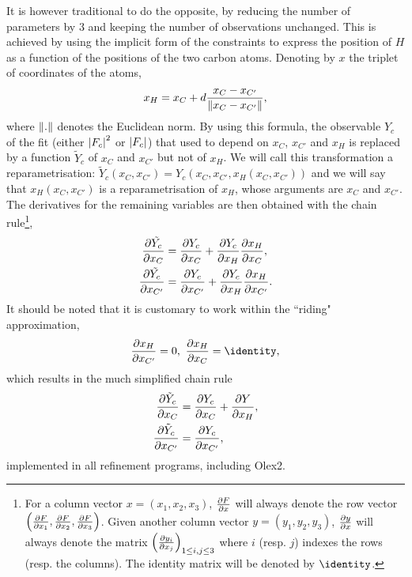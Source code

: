 \documentclass[pdf]{iucr}
\begin{document}
It is however traditional to do the opposite, by reducing the number of parameters by 3 and keeping the number of observations unchanged. This is achieved by using the implicit form of the constraints to express the position of $H$ as a function of the positions of the two carbon atoms. Denoting by $x$ the triplet of coordinates of the atoms,
\begin{equation}
x_H = x_C + d \frac{x_C - x_{C'}}{\left\| x_C - x_{C'} \right\|},
\end{equation} 
where $\left\| . \right\|$ denotes the Euclidean norm. By using this formula, the observable $Y_c$ of the fit (either $\left| F_c \right|^2$ or $\left| F_c \right|$) that used to depend on $x_C$, $x_{C'}$ and $x_H$ is replaced by a function $\tilde{Y}_c$ of $x_C$ and $x_{C'}$ but not of $x_H$. We will call this transformation a reparametrisation: $\tilde{Y}_c(x_C, x_{C'}) = Y_c(x_C, x_{C'}, x_H(x_C, x_{C'}))$ and we will say that $x_H(x_C, x_{C'})$ is a reparametrisation of $x_H$, whose arguments are $x_C$ and $x_{C'}$. The derivatives for the remaining variables are then obtained with the chain rule\footnote{For a column vector $x=(x_1, x_2, x_3)$, $\frac{\partial F}{\partial x}$ will always denote the row vector $\left(\frac{\partial F}{\partial x_1}, \frac{\partial F}{\partial x_2}, \frac{\partial F}{\partial x_3}\right)$. Given another column vector $y=(y_1, y_2, y_3)$, $\frac{\partial y}{\partial x}$ will always denote the matrix $\left(\frac{\partial y_i}{\partial x_j}\right)_{1 \le i,j \le 3}$ where $i$ (resp. $j$) indexes the rows (resp. the columns). The identity matrix will be denoted by $\identity$.},
\begin{align}
\frac{\partial \tilde{Y_c}}{\partial x_C} &= \frac{\partial Y_c}{\partial x_C} + \frac{\partial Y_c}{\partial x_H} \frac{\partial x_H}{\partial x_C}, \\
\frac{\partial \tilde{Y_c}}{\partial x_{C'}} &= \frac{\partial Y_c}{\partial x_{C'}} + \frac{\partial Y_c}{\partial x_H} \frac{\partial x_H}{\partial x_{C'}}. \nonumber
\end{align}
It should be noted that it is customary to work within the ``riding" approximation,
\begin{align}
\partialder{x_H}{x_{C'}} = 0,\ \partialder{x_H}{x_C} = \identity,
\end{align} 
which results in the much simplified chain rule
\begin{align}
\frac{\partial \tilde{Y}_c}{\partial x_C} &= \frac{\partial Y_c}{\partial x_C} + \frac{\partial Y}{\partial x_H}, \\
\frac{\partial \tilde{Y}_c}{\partial x_{C'}} &= \frac{\partial Y_c}{\partial x_{C'}}, \nonumber
\end{align}
implemented in all refinement programs, including Olex2.
\end{document}
